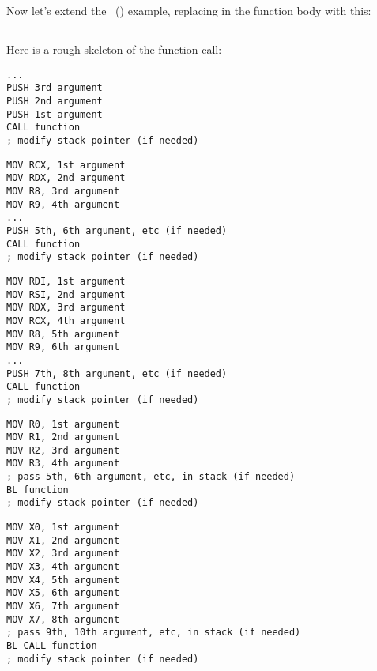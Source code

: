 \chapter{\PrintfSeveralArgumentsSectionName}

Now let's extend the \IT{\HelloWorldSectionName}~() example, replacing \printf in
the \main function body with this:







\section{\Conclusion{}}

Here is a rough skeleton of the function call:

\begin{lstlisting}[caption=x86]
...
PUSH 3rd argument
PUSH 2nd argument
PUSH 1st argument
CALL function
; modify stack pointer (if needed)
\end{lstlisting}

\begin{lstlisting}[caption=x64 (MSVC)]
MOV RCX, 1st argument
MOV RDX, 2nd argument
MOV R8, 3rd argument
MOV R9, 4th argument
...
PUSH 5th, 6th argument, etc (if needed)
CALL function
; modify stack pointer (if needed)
\end{lstlisting}

\begin{lstlisting}[caption=x64 (GCC)]
MOV RDI, 1st argument
MOV RSI, 2nd argument
MOV RDX, 3rd argument
MOV RCX, 4th argument
MOV R8, 5th argument
MOV R9, 6th argument
...
PUSH 7th, 8th argument, etc (if needed)
CALL function
; modify stack pointer (if needed)
\end{lstlisting}

\begin{lstlisting}[caption=ARM]
MOV R0, 1st argument
MOV R1, 2nd argument
MOV R2, 3rd argument
MOV R3, 4th argument
; pass 5th, 6th argument, etc, in stack (if needed)
BL function
; modify stack pointer (if needed)
\end{lstlisting}

\begin{lstlisting}[caption=ARM64]
MOV X0, 1st argument
MOV X1, 2nd argument
MOV X2, 3rd argument
MOV X3, 4th argument
MOV X4, 5th argument
MOV X5, 6th argument
MOV X6, 7th argument
MOV X7, 8th argument
; pass 9th, 10th argument, etc, in stack (if needed)
BL CALL function
; modify stack pointer (if needed)
\end{lstlisting}

